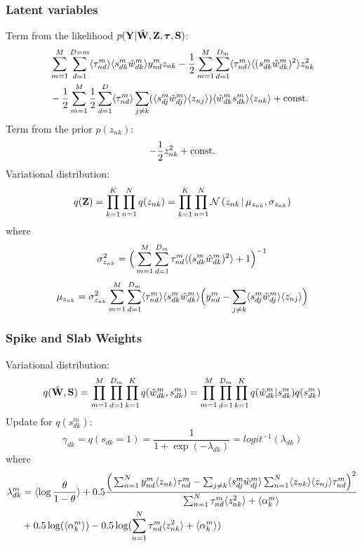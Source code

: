\documentclass[10pt, a4paper,openany]{paper}
\begin{document}
\subsubsection*{Latent variables}
Term from the likelihood $p({\bf Y}|\hat{{\bf W}},{\bf Z},\mbox{\boldmath $\tau$},{\bf S})$:
\begin{align*}
&\sum_{m=1}^{M} \sum_{d=1}^{D=m} \langle\tau_{nd}^m\rangle \langle s_{dk}^m \hat{w}_{dk}^m \rangle y_{nd}^m z_{nk}
-\frac{1}{2}\sum_{m=1}^{M} \sum_{d=1}^{D_m} \langle\tau_{nd}^m\rangle \langle (s_{dk}^m\hat{w}_{dk}^m)^2 \rangle z_{nk}^2 \\
&-\frac{1}{2}\sum_{m=1}^{M} \frac{1}{2}\sum_{d=1}^{D} \langle\tau_{nd}^m\rangle \sum_{j \neq k} (\langle s_{dj}^m \hat{w}^m_{dj} \rangle \langle z_{nj} \rangle) \langle\hat{w}^m_{dk} s_{dk}^m \rangle \langle z_{nk} \rangle + {\rm const.}
\end{align*}
Term from the prior $p(z_{nk})$:
\[
-\frac{1}{2} z_{nk}^2 + {\rm const.}
\]
Variational distribution:
\[
q({\bf Z}) = \prod_{k=1}^{K} \prod_{n=1}^{N} q(z_{nk}) = \prod_{k=1}^{K} \prod_{n=1}^{N} \mathcal{N}\left(z_{nk} \,|\, \mu_{z_{nk}},\sigma_{z_{nk}}\right)
\]
where
\[
\sigma_{z_{nk}}^2 = \Big( \sum_{m=1}^{M} \sum_{d=1}^{D_m} \tau_{nd}^m \langle (s_{dk}^m\hat{w}_{dk}^m)^2 \rangle + 1 \Big)^{-1}
\]
\[
\mu_{z_{nk}} = \sigma_{z_{nk}}^2 \sum_{m=1}^{M} \sum_{d=1}^{D_m} \langle\tau_{nd}^m\rangle \langle s_{dk}^m\hat{w}_{dk}^m \rangle \Big( y_{nd}^m - \sum_{j \neq k} \langle s_{dj}^m \hat{w}_{dj}^m \rangle \langle z_{nj} \rangle \Big)
\]

\subsubsection*{Spike and Slab Weights}
Variational distribution:
\[
q(\hat{{\bf W}},{\bf S}) = \prod_{m=1}^{M} \prod_{d=1}^{D_m} \prod_{k=1}^{K} q(\hat{w}_{dk}^m,s_{dk}^m) = \prod_{m=1}^{M} \prod_{d=1}^{D_m} \prod_{k=1}^{K} q(\hat{w}_{dk}^m|s_{dk}^m)q(s_{dk}^m)
\]
Update for $q(s_{dk}^m)$:
\[
\gamma_{dk} = q(s_{dk}=1) = \frac{1}{1+\exp(-\lambda_{dk})} =logit^{-1}(\lambda_{dk})
\]
where
\begin{align*}
\lambda_{dk}^m &= \langle \log\frac{\theta}{1-\theta} \rangle + 0.5 \frac{ \Big( \sum_{n=1}^{N} y_{nd}^m \langle z_{nk} \rangle \tau_{nd}^m- \sum_{j \neq k} \langle s_{dj}^m\hat{w}_{dj}^m\rangle \sum_{n=1}^{N} \langle z_{nk} \rangle \langle z_{nj} \rangle \tau_{nd}^m\Big)^2}{\sum_{n=1}^N \tau_{nd}^m  \langle z_{nk}^2\rangle +\langle\alpha_k^m\rangle}\\
 &+ 0.5 \log(\langle\alpha_k^m\rangle) - 0.5 \log(\sum_{n=1}^N \tau_{nd}^m  \langle z_{nk}^2\rangle +\langle\alpha_k^m\rangle)
\end{align*}
\end{document}

